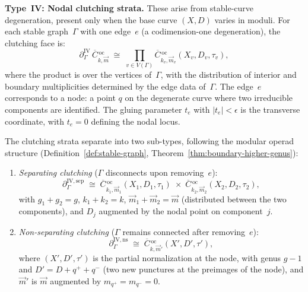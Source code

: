 \begin{proposition}
\medskip
\noindent\textbf{Type~IV: Nodal clutching strata.}
These arise from stable-curve degeneration, present only when
the base curve $(X, D)$ varies in moduli.  For each stable
graph~$\Gamma$ with one edge~$e$ (a codimension-one
degeneration), the clutching face is:
\begin{equation}\label{eq:typeIV-stratum}
\partial_\Gamma^{\mathrm{IV}}\,
\overline{C}{}^{\,\mathrm{oc}}_{k,\vec{m}}
\;\cong\;
\prod_{v \in V(\Gamma)}
\overline{C}{}^{\,\mathrm{oc}}_{k_v,\vec{m}_v}
(X_v, D_v, \tau_v),
\end{equation}
where the product is over the vertices of~$\Gamma$, with the
distribution of interior and boundary multiplicities determined
by the edge data of~$\Gamma$.  The edge~$e$ corresponds to a
node: a point $q$ on the degenerate curve where two irreducible
components are identified.  The gluing parameter
$t_e$ with $|t_e| < \epsilon$ is the transverse coordinate,
with $t_e = 0$ defining the nodal locus.

The clutching strata separate into two sub-types, following
the modular operad structure
(Definition~\ref{def:stable-graph},
Theorem~\ref{thm:boundary-higher-genus}):
\begin{enumerate}[label=\textup{(\alph*)}]
\item \emph{Separating clutching}
  ($\Gamma$ disconnects upon removing~$e$):
  \begin{equation}\label{eq:separating-clutching}
  \partial_\Gamma^{\mathrm{IV,sep}}
  \;\cong\;
  \overline{C}{}^{\,\mathrm{oc}}_{k_1, \vec{m}_1}
  (X_1, D_1, \tau_1)
  \;\times\;
  \overline{C}{}^{\,\mathrm{oc}}_{k_2, \vec{m}_2}
  (X_2, D_2, \tau_2),
  \end{equation}
  with $g_1 + g_2 = g$, $k_1 + k_2 = k$,
  $\vec{m}_1 + \vec{m}_2 = \vec{m}$ (distributed between the
  two components), and $D_j$ augmented by the nodal point
  on component~$j$.
\item \emph{Non-separating clutching}
  ($\Gamma$ remains connected after removing~$e$):
  \begin{equation}\label{eq:nonseparating-clutching}
  \partial_\Gamma^{\mathrm{IV,ns}}
  \;\cong\;
  \overline{C}{}^{\,\mathrm{oc}}_{k, \vec{m}'}
  (X', D', \tau'),
  \end{equation}
  where $(X', D', \tau')$ is the partial normalization at the
  node, with genus $g - 1$ and $D' = D + q^+ + q^-$ (two new
  punctures at the preimages of the node), and $\vec{m}'$ is
  $\vec{m}$ augmented by $m_{q^+} = m_{q^-} = 0$.
\end{enumerate}


\end{proposition}
